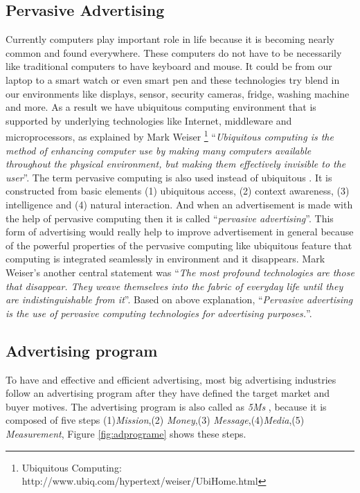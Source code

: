 \subsection{Pervasive Advertising}
Currently computers play important role in life because it is becoming nearly common and found everywhere. These computers do not have to be necessarily like traditional computers to have keyboard and mouse. It could be from our laptop to a smart watch or even smart pen and these technologies try blend in our environments like displays, sensor, security cameras, fridge, washing machine and more. As a result we have ubiquitous computing environment that is supported by underlying technologies like Internet, middleware and microprocessors, as explained by Mark Weiser \footnote{Ubiquitous Computing: http://www.ubiq.com/hypertext/weiser/UbiHome.html}  \cite{ubiquitous_computing} ``\emph{Ubiquitous computing is the method of enhancing computer use by making many computers available throughout the physical environment, but making them effectively invisible to the user}''. The term pervasive computing is also used instead of ubiquitous  \cite{pervasiv_ubiquitous}. It is constructed from basic elements \cite{pervais_ad} (1) ubiquitous access, (2) context awareness, (3) intelligence and (4) natural interaction. And when an advertisement is made with the help of pervasive computing then it is called ``\emph{pervasive advertising}''. This form of advertising would really help to improve advertisement in general because of the powerful properties of the pervasive computing like ubiquitous feature that computing is integrated seamlessly in environment and it disappears. Mark Weiser’s \cite{twenty_first} another central statement was ``\emph{The most profound technologies are those that disappear. They weave themselves into the fabric of everyday life until they are indistinguishable from it}''. Based on above explanation, ``\emph{Pervasive advertising is the use of pervasive computing technologies for advertising purposes.}''\cite{pervasiv_ad}.

\subsection{Advertising program}
To have and effective and efficient advertising, most big advertising industries follow an advertising program after they have defined the target market and buyer motives. The advertising program is also called as \emph{5Ms} \cite{adprogram}, because it is composed of five steps (1)\emph{Mission},(2) \emph{Money},(3) \emph{Message},(4)\emph{Media},(5) \emph{Measurement}, Figure \ref{fig:adprograme} shows these steps.

